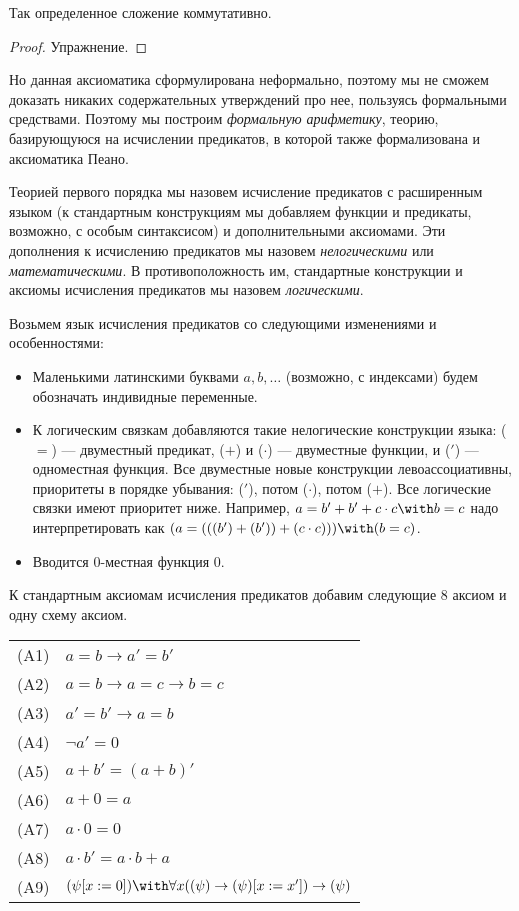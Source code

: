 \begin{theorem}Так определенное сложение коммутативно.
\end{theorem}
\begin{proof}Упражнение.\end{proof}

Но данная аксиоматика сформулирована неформально, поэтому мы не сможем
доказать никаких содержательных утверждений про нее, пользуясь формальными
средствами. Поэтому мы построим \emph{формальную арифметику}, теорию,
базирующуюся на исчислении предикатов, в которой также формализована и
аксиоматика Пеано.

\begin{definition}Теорией первого порядка мы назовем исчисление предикатов
с расширенным языком (к стандартным конструкциям мы добавляем функции и 
предикаты, возможно, с особым синтаксисом) и дополнительными аксиомами. 
Эти дополнения к исчислению предикатов мы назовем \emph{нелогическими} или 
\emph{математическими}. В противоположность им, стандартные конструкции и 
аксиомы исчисления предикатов мы назовем \emph{логическими}.
\end{definition}

Возьмем язык исчисления предикатов со следующими изменениями и особенностями:

\begin{itemize}
\item Маленькими латинскими буквами $a,b,\dots$ (возможно, с индексами) будем 
обозначать индивидные переменные. 
\item К логическим связкам добавляются такие нелогические конструкции языка: 
($=$) --- двуместный предикат, ($+$) и ($\cdot$) --- двуместные функции, и 
($'$) --- одноместная функция. Все двуместные новые конструкции левоассоциативны, 
приоритеты в порядке убывания: ($'$), потом ($\cdot$), потом ($+$). 
Все логические связки имеют приоритет ниже. Например, $a= b'+b'+c \cdot c \with b = c$ 
надо интерпретировать как $(a = (((b') + (b')) + (c \cdot c))) \with (b = c)$.
\item Вводится 0-местная функция $0$.
\end{itemize}

К стандартным аксиомам исчисления предикатов добавим следующие 8 аксиом и одну схему аксиом.

\begin{tabular}{ll}
(A1) & $a = b \rightarrow a' = b'$\\
(A2) & $a = b \rightarrow a = c \rightarrow b = c$\\
(A3) & $a' = b' \rightarrow a = b$\\
(A4) & $\neg a' = 0$\\
(A5) & $a + b' = (a+b)'$\\
(A6) & $a + 0 = a$\\
(A7) & $a \cdot 0 = 0$\\
(A8) & $a \cdot b' = a \cdot b + a$\\
(A9) & $(\psi [x := 0]) \with \forall{x}((\psi) \rightarrow (\psi) [x := x']) \rightarrow (\psi)$
\end{tabular}

